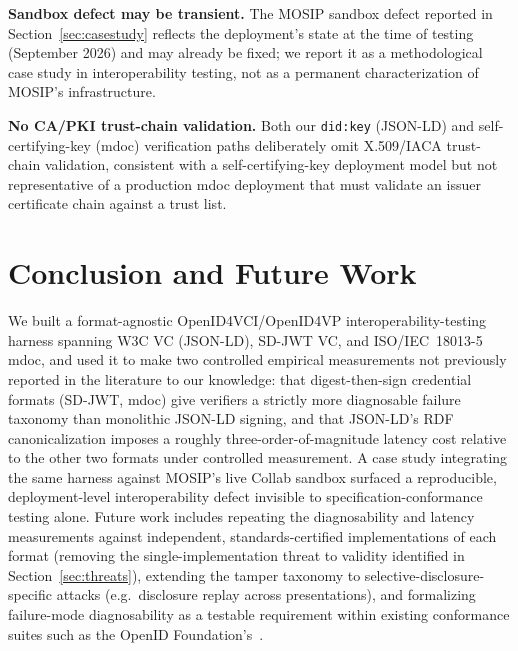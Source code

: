 \documentclass[conference]{IEEEtran}
\begin{document}
\textbf{Sandbox defect may be transient.} The MOSIP sandbox defect reported in Section~\ref{sec:casestudy} reflects the deployment's state at the time of testing (September 2026) and may already be fixed; we report it as a methodological case study in interoperability testing, not as a permanent characterization of MOSIP's infrastructure.

\textbf{No CA/PKI trust-chain validation.} Both our \texttt{did:key} (JSON-LD) and self-certifying-key (mdoc) verification paths deliberately omit X.509/IACA trust-chain validation, consistent with a self-certifying-key deployment model but not representative of a production mdoc deployment that must validate an issuer certificate chain against a trust list.

\section{Conclusion and Future Work}

We built a format-agnostic OpenID4VCI/OpenID4VP interoperability-testing harness spanning W3C VC (JSON-LD), SD-JWT VC, and ISO/IEC~18013-5 mdoc, and used it to make two controlled empirical measurements not previously reported in the literature to our knowledge: that digest-then-sign credential formats (SD-JWT, mdoc) give verifiers a strictly more diagnosable failure taxonomy than monolithic JSON-LD signing, and that JSON-LD's RDF canonicalization imposes a roughly three-order-of-magnitude latency cost relative to the other two formats under controlled measurement. A case study integrating the same harness against MOSIP's live Collab sandbox surfaced a reproducible, deployment-level interoperability defect invisible to specification-conformance testing alone. Future work includes repeating the diagnosability and latency measurements against independent, standards-certified implementations of each format (removing the single-implementation threat to validity identified in Section~\ref{sec:threats}), extending the tamper taxonomy to selective-disclosure-specific attacks (e.g.\ disclosure replay across presentations), and formalizing failure-mode diagnosability as a testable requirement within existing conformance suites such as the OpenID Foundation's~\cite{oidf-conformance}.
\end{document}
